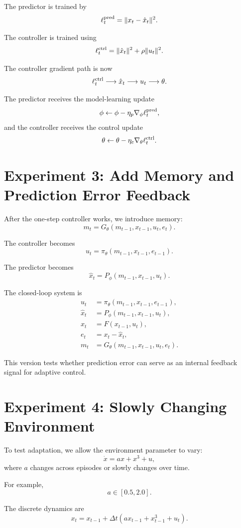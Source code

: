 \documentclass[11pt]{ctexart}
\begin{document}
The predictor is trained by
\[
\ell_t^{\rm pred}
=
\|x_t-\hat x_t\|^2.
\]

The controller is trained using
\[
\ell_t^{\rm ctrl}
=
\|\hat x_t\|^2+\rho\|u_t\|^2.
\]

The controller gradient path is now
\[
\ell_t^{\rm ctrl}
\longrightarrow
\hat x_t
\longrightarrow
u_t
\longrightarrow
\theta.
\]

The predictor receives the model-learning update
\[
\phi \leftarrow \phi-\eta_p\nabla_\phi \ell_t^{\rm pred},
\]
and the controller receives the control update
\[
\theta \leftarrow \theta-\eta_c\nabla_\theta \ell_t^{\rm ctrl}.
\]

\section{Experiment 3: Add Memory and Prediction Error Feedback}

After the one-step controller works, we introduce memory:
\[
m_t=G_\theta(m_{t-1},x_{t-1},u_t,e_t).
\]

The controller becomes
\[
u_t=\pi_\theta(m_{t-1},x_{t-1},e_{t-1}).
\]

The predictor becomes
\[
\hat x_t=P_\phi(m_{t-1},x_{t-1},u_t).
\]

The closed-loop system is
\[
\begin{aligned}
u_t &= \pi_\theta(m_{t-1},x_{t-1},e_{t-1}),\\
\hat x_t &= P_\phi(m_{t-1},x_{t-1},u_t),\\
x_t &= F(x_{t-1},u_t),\\
e_t &= x_t-\hat x_t,\\
m_t &= G_\theta(m_{t-1},x_{t-1},u_t,e_t).
\end{aligned}
\]

This version tests whether prediction error can serve as an internal feedback signal for adaptive control.

\section{Experiment 4: Slowly Changing Environment}

To test adaptation, we allow the environment parameter to vary:
\[
\dot x = a x+x^3+u,
\]
where \(a\) changes across episodes or slowly changes over time.

For example,
\[
a\in [0.5,2.0].
\]

The discrete dynamics are
\[
x_t=x_{t-1}+\Delta t\left(a x_{t-1}+x_{t-1}^3+u_t\right).
\]
\end{document}
